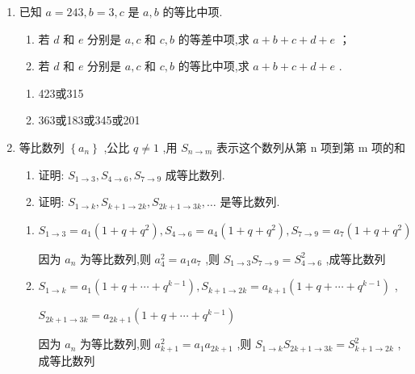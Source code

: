 \begin{enumerate}
    \item 已知 $a = {243},b = 3,c$ 是 $a,b$ 的等比中项.
    \begin{enumerate}
        \item 若 $d$ 和 $e$ 分别是 $a,c$ 和 $c,b$ 的等差中项,求 $a + b + c + d + e$ ；
        \item 若 $d$ 和 $e$ 分别是 $a,c$ 和 $c,b$ 的等比中项,求 $a + b + c + d + e$ .
    \end{enumerate}
    \begin{jieda}
        \begin{enumerate}
            \item 423或315
            \item 363或183或345或201
        \end{enumerate}
    \end{jieda}
    
    \item 等比数列 $\left\{  {a}_{n}\right\}$ ,公比 $q \neq  1$ ,用 ${S}_{n \rightarrow  m}$ 表示这个数列从第 $\mathrm{n}$ 项到第 $\mathrm{m}$ 项的和
    \begin{enumerate}
        \item 证明: ${S}_{1 \rightarrow  3},{S}_{4 \rightarrow  6},{S}_{7 \rightarrow  9}$ 成等比数列.
        \item 证明: ${S}_{1 \rightarrow  k},{S}_{k + 1 \rightarrow  {2k}},{S}_{{2k} + 1 \rightarrow  {3k}},\ldots$ 是等比数列.
    \end{enumerate}
    \begin{jieda}
        \begin{enumerate}
            \item ${S}_{1 \rightarrow  3} = {a}_{1}\left( {1 + q + {q}^{2}}\right) ,{S}_{4 \rightarrow  6} = {a}_{4}\left( {1 + q + {q}^{2}}\right) ,{S}_{7 \rightarrow  9} = {a}_{7}\left( {1 + q + {q}^{2}}\right)$
            
            因为 ${a}_{n}$ 为等比数列,则 ${a}_{4}^{2} = {a}_{1}{a}_{7}$ ,则 ${S}_{1 \rightarrow  3}{S}_{7 \rightarrow  9} = {S}_{4 \rightarrow  6}^{2}$ ,成等比数列
            \item  ${S}_{1 \rightarrow  k} = {a}_{1}\left( {1 + q + \cdots  + {q}^{k - 1}}\right) ,{S}_{k + 1 \rightarrow  {2k}} = {a}_{k + 1}\left( {1 + q + \cdots  + {q}^{k - 1}}\right)$ ,

            ${S}_{{2k} + 1 \rightarrow  {3k}} = {a}_{{2k} + 1}\left( {1 + q + \cdots  + {q}^{k - 1}}\right)$

            因为 ${a}_{n}$ 为等比数列,则 ${a}_{k + 1}^{2} = {a}_{1}{a}_{{2k} + 1}$ ,则 ${S}_{1 \rightarrow  k}{S}_{{2k} + 1 \rightarrow  {3k}} = {S}_{k + 1 \rightarrow  {2k}}^{2}$ ,成等比数列


\end{enumerate}
\end{jieda}
\end{enumerate}
